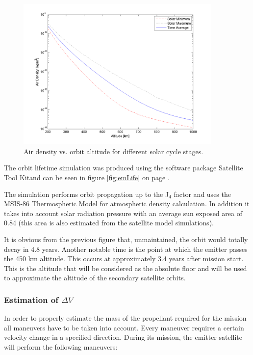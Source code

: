 \begin{figure}[ht]
\centering
\includegraphics[width=0.9\textwidth, angle=0]{chapters/img/densityAltitude.png}
\caption{Air density vs. orbit altitude for different solar cycle stages.}
\label{fig:densityProfile}
\end{figure}

The orbit lifetime simulation was produced using the software package Satellite Tool Kit\texttrademark and can be seen in figure \ref{fig:emLife} on page \pageref{fig:emLife}.

The simulation performs orbit propagation up to the J$_4$ factor and uses the MSIS-86 Thermospheric Model for atmospheric density calculation. In addition it takes into account solar radiation pressure with an average sun exposed area of 0.84 (this area is also estimated from the satellite model simulations).

It is obvious from the previous figure that, unmaintained, the orbit would totally decay in 4.8 years. Another notable time is the point at which the emitter passes the 450 km altitude. This occurs at approximately 3.4 years after mission start. This is the altitude that will be considered as the absolute floor and will be used to approximate the altitude of the secondary satellite orbits.


\subsubsection{Estimation of $\Delta V$}
\label{frEmDV}

In order to properly estimate the mass of the propellant required for the mission all maneuvers have to be taken into account. Every maneuver requires a certain velocity change in a specified direction. During its mission, the emitter satellite will perform the following maneuvers:

